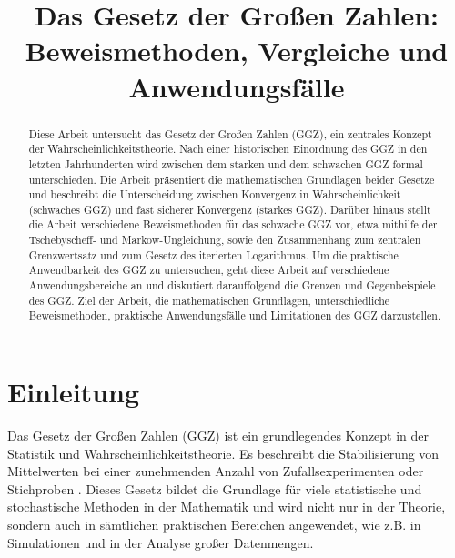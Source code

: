 \documentclass[aodsor,preprint]{imsart}
\numberwithin{equation}{section}
\theoremstyle{plain}
\begin{document}
\begin{frontmatter}
\title{Das Gesetz der Großen Zahlen: Beweismethoden,
Vergleiche und Anwendungsfälle}


\begin{aug}
\author{ }




\end{aug}

\begin{abstract}
    Diese Arbeit untersucht das Gesetz der Großen Zahlen (GGZ), ein zentrales Konzept der Wahrscheinlichkeitstheorie.
    Nach einer historischen Einordnung des GGZ in den letzten Jahrhunderten wird zwischen dem starken und dem schwachen GGZ formal unterschieden.
    Die Arbeit präsentiert die mathematischen Grundlagen beider Gesetze und beschreibt die Unterscheidung zwischen Konvergenz in Wahrscheinlichkeit (schwaches GGZ) und fast sicherer Konvergenz (starkes GGZ).
    Darüber hinaus stellt die Arbeit verschiedene Beweismethoden für das schwache GGZ vor, etwa mithilfe der Tschebyscheff- und Markow-Ungleichung, sowie den Zusammenhang zum zentralen Grenzwertsatz und zum Gesetz des iterierten Logarithmus.
    Um die praktische Anwendbarkeit des GGZ zu untersuchen, geht diese Arbeit auf verschiedene Anwendungsbereiche an und diskutiert darauffolgend die Grenzen und Gegenbeispiele des GGZ.
    Ziel der Arbeit, die mathematischen Grundlagen, unterschiedliche Beweismethoden, praktische Anwendungsfälle und Limitationen des GGZ darzustellen.
\end{abstract}

\begin{keyword}[class=MSC]
\end{keyword}

\begin{keyword}
\kwd{\LaTeXe}
\end{keyword}

\end{frontmatter}

\section{Einleitung}
\label{sec:einleitung}
Das Gesetz der Großen Zahlen (GGZ) ist ein grundlegendes Konzept in der Statistik und Wahrscheinlichkeitstheorie.
Es beschreibt die Stabilisierung von Mittelwerten bei einer zunehmenden Anzahl von Zufallsexperimenten oder Stichproben \citep{degroot2021}.
Dieses Gesetz bildet die Grundlage für viele statistische und stochastische Methoden in der Mathematik und wird nicht nur in der Theorie, sondern auch in sämtlichen praktischen Bereichen angewendet, wie z.B. in Simulationen und in der Analyse großer Datenmengen.
\end{document}
